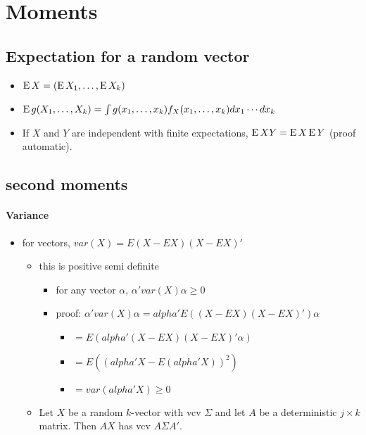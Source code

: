\section{Moments}
\subsection{Expectation for a random vector}

\begin{itemize}
\item $\operatorname{E} X = (\operatorname{E} X_1,\dots,\operatorname{E} X_k)$
\item $\operatorname{E} g(X_1,\dots,X_k) = \int g(x_1,\dots,x_k) f_X(x_1,\dots,x_k)
       dx_1 \cdots dx_k$
\item If $X$ and $Y$ are independent with finite expectations, $\operatorname{E} XY
       = \operatorname{E} X \operatorname{E} Y$ (proof automatic).
\end{itemize}

\subsection{second moments}

\paragraph{Variance}
\begin{itemize}
\item for vectors, $var(X) = E(X - EX) (X - EX)'$
\begin{itemize}
\item this is positive semi definite
\begin{itemize}
\item for any vector $\alpha$, $\alpha'var(X)\alpha \geq 0$
\item proof: $\alpha' var(X) \alpha = alpha' E((X - EX)(X - EX)') \alpha$
\begin{itemize}
\item $= E( alpha'(X - EX)(X - EX)' \alpha)$
\item $= E( (alpha'X - E(alpha'X))^2)$
\item $= var(alpha'X) \geq 0$
\end{itemize}
\end{itemize}
\item Let $X$ be a random $k$-vector with vcv $\Sigma$ and let
         $A$ be a deterministic $j \times k$ matrix.  Then $A X$
         has vcv $A \Sigma A'$.
\end{itemize}
\end{itemize}

